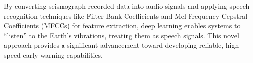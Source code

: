 {By converting seismograph-recorded data into audio signals and applying speech recognition techniques like Filter Bank Coefficients and Mel Frequency Cepstral Coefficients (MFCCs) for feature extraction, deep learning enables systems to “listen” to the Earth’s vibrations, treating them as speech signals. This novel approach provides a significant advancement toward developing reliable, high-speed early warning capabilities.
}
